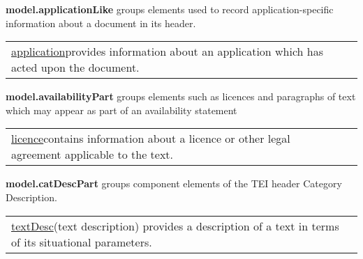 \begin{sansreflist}
  
\item [\textbf{model.applicationLike}] groups elements used to record application-specific information about a document in its header. \par 
\begin{longtable}{P{0.28826086956521735\textwidth}P{0.5617391304347825\textwidth}}
\hyperref[TEI.application]{application}\tabcellsep provides information about an application which has acted upon the document.\end{longtable} \par
 
\item [\textbf{model.availabilityPart}] groups elements such as licences and paragraphs of text which may appear as part of an availability statement \par 
\begin{longtable}{P{0.22715517241379307\textwidth}P{0.6228448275862069\textwidth}}
\hyperref[TEI.licence]{licence}\tabcellsep contains information about a licence or other legal agreement applicable to the text.\end{longtable} \par
 
\item [\textbf{model.catDescPart}] groups component elements of the TEI header Category Description. \par 
\begin{longtable}{P{0.22620967741935483\textwidth}P{0.6237903225806452\textwidth}}
\hyperref[TEI.textDesc]{textDesc}\tabcellsep (text description) provides a description of a text in terms of its situational parameters.\end{longtable} \par
 

\end{sansreflist}

